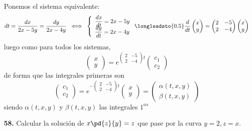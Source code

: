 \begin{sol}
    Ponemos el sistema equivalente:
    $$dt=\dfrac{dx}{2x-5y}=\dfrac{dy}{2x-4y} \; \iff \; \left\{ \begin{array}{l}
         \dfrac{dx}{dt}=2x-5y  \\
         \vspace{-5mm} \\
          \dfrac{dy}{dt}=2x-4y
    \end{array}\right.\longleadsto{0.5} \dfrac{d}{dt}\begin{pmatrix}
        x \\ y 
    \end{pmatrix}=\begin{pmatrix}
        2 & -5 \\ 2 & -4 
    \end{pmatrix} \begin{pmatrix}
        x \\ y 
    \end{pmatrix}$$
    luego como para todos los sistemas,
    $$\begin{pmatrix}
        x \\ y 
    \end{pmatrix} = e^{\left(\begin{smallmatrix}
       2 & -5 \\ 2 & -4 
    \end{smallmatrix}\right)t} \begin{pmatrix}
        c_1\\ c_2 
    \end{pmatrix}$$
    de forma que las integrales primeras son 
    $$ \begin{pmatrix}
        c_1\\ c_2 
    \end{pmatrix} = e^{-\left(\begin{smallmatrix}
       2 & -5 \\ 2 & -4 
    \end{smallmatrix}\right)t} \begin{pmatrix}
        x \\ y 
    \end{pmatrix}= \begin{pmatrix}
        \alpha(t,x,y) \\ \beta(t,x,y) 
    \end{pmatrix}$$
    siendo $ \alpha(t,x,y)$ y $ \beta(t,x,y)$ las integrales $1^{as}$
\end{sol}
\begin{ejer}
    \textbf{58.} Calcular la solución de $x\pd{z}{y}=z$ que pase por la curva $y=2, z=x$.
\end{ejer}
